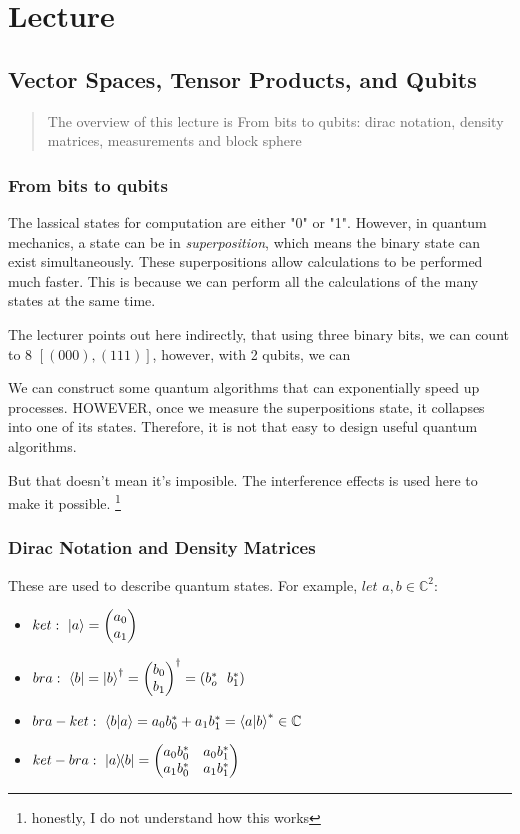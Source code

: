 \section{Lecture}
\subsection{Vector Spaces, Tensor Products, and Qubits}

\begin{abstract}
   \noindent The overview of this lecture is  From bits to qubits: dirac notation, density matrices, measurements and block sphere
\end{abstract}

\subsubsection{From bits to qubits}
The lassical states for computation are either "0" or "1". However, in quantum mechanics, a state can be in \textit{superposition}, which means the binary state can exist simultaneously. These superpositions allow calculations to be performed much faster. This is because we can perform all the calculations of the many states at the same time. 

The lecturer points out here indirectly, that using three binary bits, we can count to 8 $[(000),(111)]$, however, with 2 qubits, we can 

We can construct some quantum algorithms that can exponentially speed up processes. HOWEVER, once we measure the superpositions state, it collapses into one of its states. Therefore, it is not that easy to design useful quantum algorithms.

But that doesn't mean it's imposible. The interference effects is used here to make it possible. \footnote{honestly, I do not understand how this works}

\subsubsection{Dirac Notation and Density Matrices}
These are used to describe quantum states. For example, $let$ $a,b \in \mathbb{C}^2$:
\begin{itemize}
    \item $ ket:\ \ket{a} = \begin{pmatrix} a_0 \\ a_1 \end{pmatrix} $
    \item $ bra:\ \bra{b} = \ket{b}^\dagger= \begin{pmatrix} b_0 \\ b_1 \end{pmatrix}^\dagger = (b_o^* \ \ b_1^*) $
    \item $ bra-ket:\ \braket{b}{a} = a_0b_0^* + a_1b_1^*  = \braket{a}{b}^* \in \mathbb{C}$ 
    \item $ket-bra:\ \ketbra{a}{b} = 
    \begin{pmatrix}
        a_0b_0^* & a_0b_1^*\\
        a_1b_0^* & a_1b_1^*
    \end{pmatrix}$
\end{itemize}

